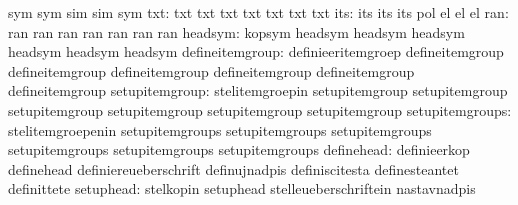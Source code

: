                                   sym                              sym
                                  sim                              sim
                                  sym
                             txt: txt                              txt
                                  txt                              txt
                                  txt                              txt
                                  txt
                             its: its                              its
                                  its                              pol %
                                  el                               el  %
                                  el %
                             ran: ran                              ran
                                  ran                              ran
                                  ran                              ran
                                  ran
                         headsym: kopsym                           headsym
                                  headsym                          headsym
                                  headsym                          headsym
                                  headsym
                 defineitemgroup: definieeritemgroep               defineitemgroup
                                  defineitemgroup                  defineitemgroup
                                  defineitemgroup                  defineitemgroup
                                  defineitemgroup
                  setupitemgroup: stelitemgroepin                  setupitemgroup
                                  setupitemgroup                   setupitemgroup
                                  setupitemgroup                   setupitemgroup
                                  setupitemgroup
                 setupitemgroups: stelitemgroepenin                setupitemgroups
                                  setupitemgroups                  setupitemgroups
                                  setupitemgroups                  setupitemgroups
                                  setupitemgroups
                      definehead: definieerkop                     definehead
                                  definiereueberschrift            definujnadpis
                                  definiscitesta                   definesteantet
                                  definittete
                       setuphead: stelkopin                        setuphead
                                  stelleueberschriftein            nastavnadpis
